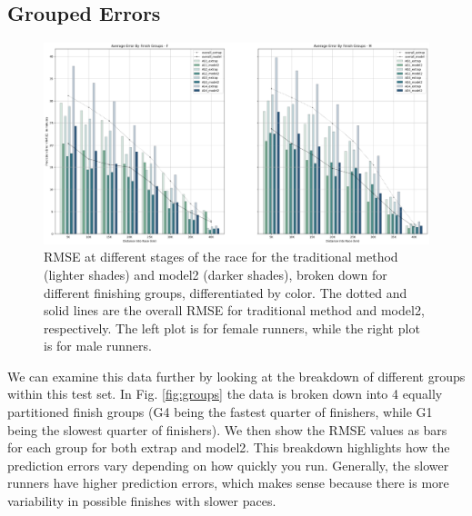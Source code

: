 \documentclass[USenglish,twocolumn]{article}
\theoremstyle{dgthm}
\theoremstyle{dgdef}
\newcommand{\mycomment}[1]{}
\begin{document}
\subsection{Grouped Errors}
\label{groupederrorsection}

\begin{figure}[ht]
    \centering
    \includegraphics[width=6.2in]{../analysis/bos_rmse_gender_age.png}
    \caption{RMSE at different stages of the race for the traditional method (lighter shades) and model2 (darker shades), broken down for different finishing groups, differentiated by color. The dotted and solid lines are the overall RMSE for traditional method and model2, respectively. The left plot is for female runners, while the right plot is for male runners.}
     \label{fig:breakdown}
\end{figure}

We can examine this data further by looking at the breakdown of different groups within this test set. In Fig. \ref{fig:groups} the data is broken down into 4 equally partitioned finish groups (G4 being the fastest quarter of finishers, while G1 being the slowest quarter of finishers). We then show the RMSE values as bars for each group for both extrap and model2. This breakdown highlights how the prediction errors vary depending on how quickly you run. Generally, the slower runners have higher prediction errors, which makes sense because there is more variability in possible finishes with slower paces. 

\mycomment{Interestingly, the model underperforms compared to the baseline method for the faster runners in the beginning stages of the race. G4 runners (the fastest quarter of runners) actually see the model underperforming until 20K, when the model starts outperforming the baseline for the rest of the race. G3 runners experience this until a switch at 15K, and even G2 runners experience this at 5K before a switch at 10K. G1 runners as a group consistently benefit from a model better than the baseline, which is very important given that these runners have the most uncertainty with their times. }
\end{document}
